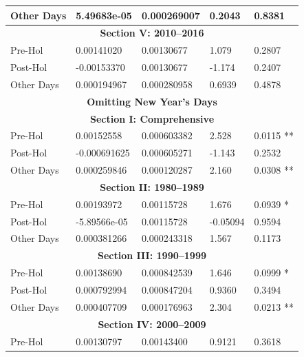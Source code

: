 \documentclass[11pt, english]{article}
\begin{document}
\begin{center}
\begin{longtable}{p{2cm}p{2cm}p{2cm}p{2cm}p{2cm}}
                Other Days & 5.49683e-05 & 0.000269007 & 0.2043 & 0.8381\\
                \hline 
                \multicolumn{5}{c}{\textbf{Section V: 2010--2016}}\\   
                \hline            
                Pre-Hol & 0.00141020 & 0.00130677 & 1.079 & 0.2807\\ 
                Post-Hol & -0.00153370 & 0.00130677 & -1.174 & 0.2407\\  
                Other Days & 0.000194967 & 0.000280958 & 0.6939 & 0.4878\\
		\hline 
                \hline                                          
                \multicolumn{5}{c}{\textbf{Omitting New Year's Days}}\\ 
                \hline
                \hline
                \multicolumn{5}{c}{\textbf{Section I: Comprehensive}}\\
                \hline
                Pre-Hol & 0.00152558 & 0.000603382 & 2.528 & 0.0115 **\\
                Post-Hol & -0.000691625 & 0.000605271 & -1.143 & 0.2532\\
                Other Days & 0.000259846 & 0.000120287 & 2.160 & 0.0308 **\\
                \hline
                \multicolumn{5}{c}{\textbf{Section II: 1980--1989}}\\
                \hline
                Pre-Hol & 0.00193972 & 0.00115728 & 1.676 & 0.0939 *\\
                Post-Hol & -5.89566e-05 & 0.00115728 & -0.05094 & 0.9594\\  
                Other Days & 0.000381266 & 0.000243318 & 1.567 & 0.1173\\
                \hline 
                \multicolumn{5}{c}{\textbf{Section III: 1990--1999}}\\   
                \hline            
                Pre-Hol & 0.00138690 & 0.000842539 & 1.646 & 0.0999 *\\ 
                Post-Hol & 0.000792994 & 0.000847204 & 0.9360 & 0.3494\\  
                Other Days & 0.000407709 & 0.000176963 & 2.304 & 0.0213 **\\
                \hline 
                \multicolumn{5}{c}{\textbf{Section IV: 2000--2009}}\\
                \hline                                          
                Pre-Hol & 0.00130797 & 0.00143400 & 0.9121 & 0.3618\\

\end{longtable}
\end{center}
\end{document}
